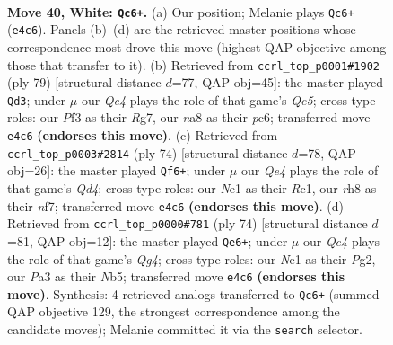 \documentclass[11pt]{article}
\begin{document}
\clearpage

\begin{figure}[p]\centering
\begin{subfigure}{0.46\textwidth}\centering
\resizebox{\linewidth}{!}{%
\newchessgame
\chessboard[
  setfen={n6r/8/6k1/1p3b2/4Q1pp/P2P1P2/7K/4Nq2 w - - 10 40},
  showmover=false,
  pgfstyle=straightmove, color=movearrow, markmove={e4-c6}
]}
\caption{}
\end{subfigure}\hfill
\begin{subfigure}{0.46\textwidth}\centering
\resizebox{\linewidth}{!}{%
\newchessgame
\chessboard[
  setfen={8/p5rk/2PQ4/3n1p2/4qP2/4p3/P3R1B1/7K b - - 4 40},
  showmover=false,
  pgfstyle=straightmove, color=movearrow, markmove={e4-d3}
]}
\caption{}
\end{subfigure}
\\[4pt]
\begin{subfigure}{0.46\textwidth}\centering
\resizebox{\linewidth}{!}{%
\newchessgame
\chessboard[
  setfen={3k4/p4n2/2pb4/5p2/1P1Q1P2/q3PK2/8/2R5 w - - 0 38},
  showmover=false,
  pgfstyle=straightmove, color=movearrow, markmove={d4-f6}
]}
\caption{}
\end{subfigure}\hfill
\begin{subfigure}{0.46\textwidth}\centering
\resizebox{\linewidth}{!}{%
\newchessgame
\chessboard[
  setfen={6k1/1p4b1/8/1Np1p3/5PQ1/P7/1P1q2PP/6K1 w - - 1 38},
  showmover=false,
  pgfstyle=straightmove, color=movearrow, markmove={g4-e6}
]}
\caption{}
\end{subfigure}
\caption{\textbf{Move 40, White: \texttt{Qc6+}.} (a) Our position; Melanie plays \texttt{Qc6+} (\texttt{e4c6}). Panels (b)--(d) are the retrieved master positions whose correspondence most drove this move (highest QAP objective among those that transfer to it). (b) Retrieved from \texttt{ccrl\_top\_p0001\#1902} (ply 79) [structural distance $d$=77, QAP obj=45]: the master played \texttt{Qd3}; under $\mu$ our \emph{Qe4} plays the role of that game's \emph{Qe5}; cross-type roles: our \emph{P}f3 as their \emph{R}g7, our \emph{n}a8 as their \emph{p}c6; transferred move \texttt{e4c6} \textbf{(endorses this move)}. (c) Retrieved from \texttt{ccrl\_top\_p0003\#2814} (ply 74) [structural distance $d$=78, QAP obj=26]: the master played \texttt{Qf6+}; under $\mu$ our \emph{Qe4} plays the role of that game's \emph{Qd4}; cross-type roles: our \emph{N}e1 as their \emph{R}c1, our \emph{r}h8 as their \emph{n}f7; transferred move \texttt{e4c6} \textbf{(endorses this move)}. (d) Retrieved from \texttt{ccrl\_top\_p0000\#781} (ply 74) [structural distance $d$=81, QAP obj=12]: the master played \texttt{Qe6+}; under $\mu$ our \emph{Qe4} plays the role of that game's \emph{Qg4}; cross-type roles: our \emph{N}e1 as their \emph{P}g2, our \emph{P}a3 as their \emph{N}b5; transferred move \texttt{e4c6} \textbf{(endorses this move)}. Synthesis: 4 retrieved analogs transferred to \texttt{Qc6+} (summed QAP objective 129, the strongest correspondence among the candidate moves); Melanie committed it via the \texttt{search} selector.}
\label{fig:thought-m78}
\end{figure}
\end{document}
